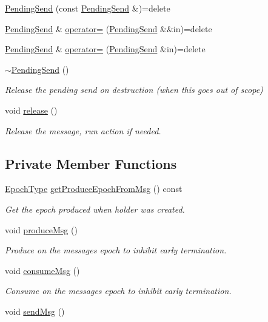 \begin{DoxyCompactItemize}
\hyperlink{structvt_1_1messaging_1_1_pending_send_a951912c336cf3cdaf91f8ccde13092af}{Pending\+Send} (const \hyperlink{structvt_1_1messaging_1_1_pending_send}{Pending\+Send} \&)=delete
\item 
\hyperlink{structvt_1_1messaging_1_1_pending_send}{Pending\+Send} \& \hyperlink{structvt_1_1messaging_1_1_pending_send_aecef2d10d22564d142b9de52a57d81c8}{operator=} (\hyperlink{structvt_1_1messaging_1_1_pending_send}{Pending\+Send} \&\&in)=delete
\item 
\hyperlink{structvt_1_1messaging_1_1_pending_send}{Pending\+Send} \& \hyperlink{structvt_1_1messaging_1_1_pending_send_addfa1d51e3b8f272b5e711867e893bca}{operator=} (\hyperlink{structvt_1_1messaging_1_1_pending_send}{Pending\+Send} \&in)=delete
\item 
\hyperlink{structvt_1_1messaging_1_1_pending_send_ade803ff2903a92eaf62b6e330593871b}{$\sim$\+Pending\+Send} ()
\begin{DoxyCompactList}\small\item\em Release the pending send on destruction (when this goes out of scope) \end{DoxyCompactList}\item 
void \hyperlink{structvt_1_1messaging_1_1_pending_send_ad4b41412f953dcd22b3e3020a812f757}{release} ()
\begin{DoxyCompactList}\small\item\em Release the message, run action if needed. \end{DoxyCompactList}\end{DoxyCompactItemize}
\subsection*{Private Member Functions}
\begin{DoxyCompactItemize}
\item 
\hyperlink{namespacevt_a81d11b28122d43bf9834577e4a06440f}{Epoch\+Type} \hyperlink{structvt_1_1messaging_1_1_pending_send_a8293dffe4d8cdc81de573d2edf0ee4cb}{get\+Produce\+Epoch\+From\+Msg} () const
\begin{DoxyCompactList}\small\item\em Get the epoch produced when holder was created. \end{DoxyCompactList}\item 
void \hyperlink{structvt_1_1messaging_1_1_pending_send_af5961bb21b4a427732be91ac699d570b}{produce\+Msg} ()
\begin{DoxyCompactList}\small\item\em Produce on the messages epoch to inhibit early termination. \end{DoxyCompactList}\item 
void \hyperlink{structvt_1_1messaging_1_1_pending_send_a0f249a127a798ba0823fae82c925ed3b}{consume\+Msg} ()
\begin{DoxyCompactList}\small\item\em Consume on the messages epoch to inhibit early termination. \end{DoxyCompactList}\item 
void \hyperlink{structvt_1_1messaging_1_1_pending_send_a93da625c74a5d35ca0b7dec3fad86152}{send\+Msg} ()
\end{DoxyCompactItemize}
